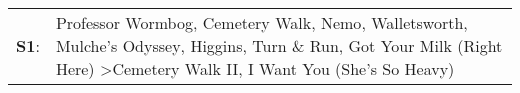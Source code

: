 \begin{supertabular}{p{0.03\textwidth}p{0.92\textwidth}}
 \textbf{S1}:  &  Professor Wormbog\textsuperscript{}, \enspace Cemetery Walk\textsuperscript{}, \enspace Nemo\textsuperscript{}, \enspace Walletsworth\textsuperscript{}, \enspace Mulche's Odyssey\textsuperscript{}, \enspace Higgins\textsuperscript{}, \enspace Turn \& Run\textsuperscript{}, \enspace Got Your Milk (Right Here)\textsuperscript{} \textgreater \enspace Cemetery Walk II\textsuperscript{}, \enspace I Want You (She's So Heavy)\textsuperscript{}  \enspace  \\
\end{supertabular}
